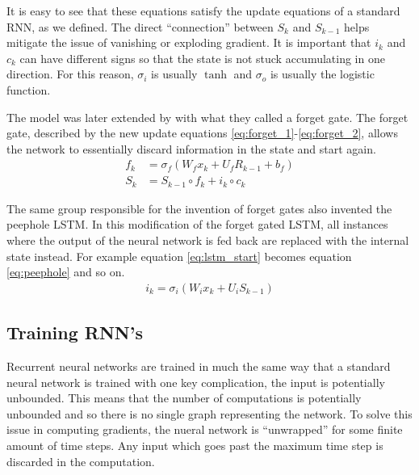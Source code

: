 It is easy to see that these equations satisfy the update equations of a standard RNN, as we defined.  The direct ``connection'' between $S_k$ and $S_{k-1}$ helps mitigate the issue of vanishing or exploding gradient.  It is important that $i_k$ and $c_k$ can have different signs so that the state is not stuck accumulating in one direction.  For this reason, $\sigma_i$ is usually $\tanh$ and $\sigma_o$ is usually the logistic function.

The model was later extended by \cite{fg00} with what they called a forget gate.  The forget gate, described by the new update equations \ref{eq:forget_1}-\ref{eq:forget_2}, allows the network to essentially discard information in the state and start again.
\begin{align}
f_k &= \sigma_f(W_fx_k + U_fR_{k-1} + b_f)\label{eq:forget_1}\\
S_k &= S_{k-1}\circ f_k + i_k \circ c_k\label{eq:forget_2}
\end{align}

The same group responsible for the invention of forget gates also invented the peephole LSTM. \cite{fg00_2} In this modification of the forget gated LSTM, all instances where the output of the neural network is fed back are replaced with the internal state instead.  For example equation \ref{eq:lstm_start} becomes equation \ref{eq:peephole} and so on.
\begin{align}\label{eq:peephole}
i_k = \sigma_i(W_ix_k + U_iS_{k-1})
\end{align}

\subsection{Training RNN's}\label{sec:rnn_training}
Recurrent neural networks are trained in much the same way that a standard neural network is trained with one key complication, the input is potentially unbounded.  This means that the number of computations is potentially unbounded and so there is no single graph representing the network.  To solve this issue in computing gradients, the nueral network is ``unwrapped'' for some finite amount of time steps.  Any input which goes past the maximum time step is discarded in the computation.
